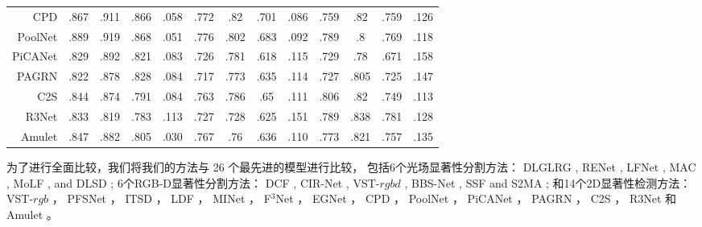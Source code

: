\begin{table}[!ht]
{\begin{tabular}{rcccccccccccc}
			CPD  \cite{wu2019cascaded}
			& .867 & .911 & .866 & .058 
			& .772 & .82  & .701 & .086 
			& .759 & .82  & .759 & .126 \\
			
			PoolNet \cite{liu2019simple}
			& .889 & .919 & .868 & .051 
			& .776 & .802 & .683 & .092 
			& .789 & .8   & .769 & .118 \\
			
			PiCANet \cite{liu2018picanet}
			& .829 & .892 & .821 & .083 
			& .726 & .781 & .618 & .115 
			& .729 & .78  & .671 & .158 \\
			
			PAGRN \cite{wang2018detect}
			& .822 & .878 & .828 & .084 
			& .717 & .773 & .635 & .114 
			& .727 & .805 & .725 & .147 \\
			
			C2S   \cite{li2018contour}
			& .844 & .874 & .791 & .084 
			& .763 & .786 & .65  & .111 
			& .806 & .82  & .749 & .113 \\
			
			R3Net  \cite{deng2018r3net}
			& .833 & .819 & .783 & .113 
			& .727 & .728 & .625 & .151 
			& .789 & .838 & .781 & .128 \\
			
			Amulet \cite{zhang2017amulet}
			& .847 & .882 & .805 & .030 
			& .767 & .76  & .636 & .110  
			& .773 & .821 & .757 & .135 \\
			
			
			\bottomrule %
		\end{tabular}
	}
\end{table}
%
%


为了进行全面比较，我们将我们的方法与 26 个最先进的模型进行比较，
包括6个光场显著性分割方法：
DLGLRG \cite{liu2021light}, RENet \cite{piao2020exploit}, LFNet \cite{zhang2020lfnet},
MAC \cite{zhang2020light}, MoLF \cite{zhang2019memory}, and DLSD \cite{piao2019deep};
%
%
%
%
6个RGB-D显著性分割方法：
DCF \cite{ji2021calibrated}, CIR-Net \cite{cong2022cir}, VST-$rgbd$  \cite{liu2021visual},
BBS-Net     \cite{fan2020bbs}, SSF     \cite{zhang2020select} and S2MA    \cite{liu2020learning};
%
%
%
%
%
和14个2D显著性检测方法：
VST-$rgb$ \cite{liu2021visual}，
PFSNet \cite{ma2021pyramidal}，
ITSD \cite{zhou2020interactive}，
LDF \cite{wei2020label}，
MINet \cite{pang2020multi}，
F$^{3}$Net  \cite{wei2020f3net}， 
EGNet   \cite{zhao2019egnet}，
CPD  \cite{wu2019cascaded}，
PoolNet \cite{liu2019simple}，
PiCANet \cite{liu2018picanet}，
PAGRN \cite{wang2018detect}，
C2S   \cite{li2018contour}，
R3Net  \cite{deng2018r3net}
和
Amulet \cite{zhang2017amulet}。

